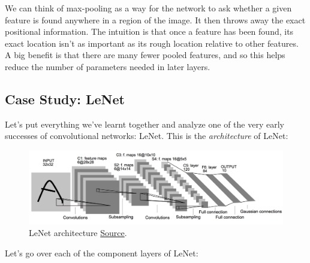 \documentclass[a4paper]{tufte-handout}
\begin{document}
We can think of max-pooling as a way for the network to ask whether a
given feature is found anywhere in a region of the image. It then throws
away the exact positional information. The intuition is that once a
feature has been found, its exact location isn't as important as its
rough location relative to other features. A big benefit is that there
are many fewer pooled features, and so this helps reduce the number of
parameters needed in later layers.

\subsection{Case Study: LeNet}\label{case-study-lenet}

Let's put everything we've learnt together and analyze one of the very
early successes  of convolutional networks: LeNet. This
is the \emph{architecture} of LeNet:

\begin{figure}
\includegraphics[width=150mm]{lenet.png}
\caption{LeNet architecture
\href{http://yann.lecun.com/exdb/publis/pdf/lecun-01a.pdf}{Source}. }
\end{figure}

Let's go over each of the component layers of LeNet:
\end{document}
